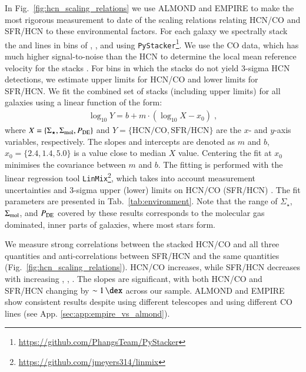 \documentclass[letter, longauth]{aa} %
\begin{document}
In Fig.~\ref{fig:hcn_scaling_relations} we use ALMOND and EMPIRE to make the most rigorous measurement to date of the scaling relations relating HCN/CO and SFR/HCN to these environmental factors. For each galaxy we spectrally stack the \hcnone and \coone lines in bins of \sigstar, \sigmol, and \pde using \texttt{PyStacker}\footnote{\url{https://github.com/PhangsTeam/PyStacker}}. We use the CO data, which has much higher signal-to-noise than the HCN to determine the local mean reference velocity for the stacks \citep[see][and references therein for details on the spectral stacking methodology; App.~\ref{sec:app:stacking} presents the spectral stacks of HCN and CO]{Neumann2023b}. 
For bins in which the stacks do not yield 3-sigma HCN detections, we estimate upper limits for HCN/CO and lower limits for SFR/HCN. 
We fit the combined set of stacks (including upper limits) for all galaxies using a linear function of the form:
\begin{align}
	\log_{10} Y = b + m \cdot (\log_{10} X - x_0)\;,
    \label{equ:fit_function}
\end{align}
where $X=\{\Sigma_{\star}, \Sigma_{\text{mol}}, P_{\text{DE}}\}$ and $Y=\{\mathrm{HCN/CO}, \mathrm{SFR/HCN}\}$ are the $x$- and $y$-axis variables, respectively. 
The slopes and intercepts are denoted as $m$ and $b$, $x_0=\{2.4, 1.4, 5.0\}$ is a value close to median $X$ value. 
Centering the fit at $x_0$ minimises the covariance between $m$ and $b$. The fitting is performed with the linear regression tool \texttt{LinMix}\footnote{\url{https://github.com/jmeyers314/linmix}}, which takes into account measurement uncertainties and 3-sigma upper (lower) limits on HCN/CO (SFR/HCN) \citep[see e.g.][for more details on the fitting routine]{Neumann2023a}.
The fit parameters are presented in Tab.~\ref{tab:environment}. Note that the range of $\Sigma_\star$, $\Sigma_{\rm mol}$, and $P_{\rm DE}$ covered by these results corresponds to the molecular gas dominated, inner parts of galaxies, where most stars form.

We measure strong correlations between the stacked HCN/CO and all three quantities and anti-correlations between SFR/HCN and the same quantities (Fig.~\ref{fig:hcn_scaling_relations}). 
HCN/CO increases, while SFR/HCN decreases with increasing \sigstar, \sigmol, \pde. 
The slopes are significant, with both HCN/CO and SFR/HCN changing by $\sim\SI{1}{\dex}$ across our sample. 
ALMOND and EMPIRE show consistent results despite using different telescopes and using different CO lines (see App. \ref{sec:app:empire_vs_almond}).
\end{document}
